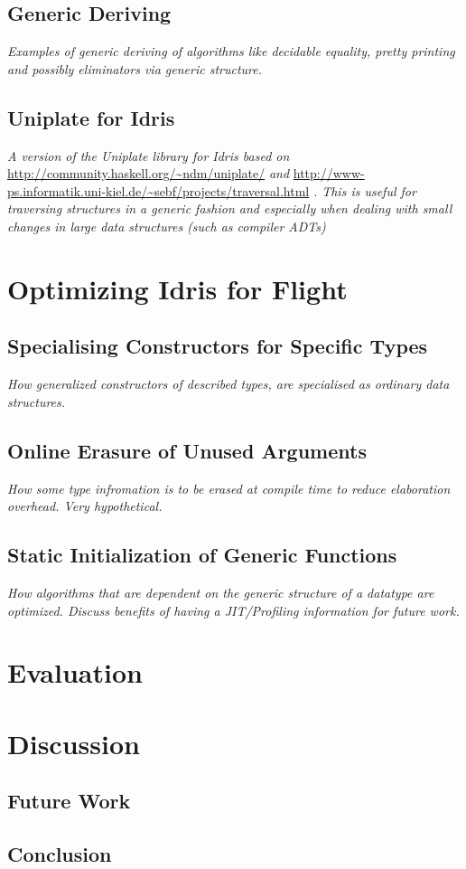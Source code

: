 \documentclass{ituthesis}
\begin{document}
\section{Generic Deriving}
\label{sec:GenericDeriving}
\textit{Examples of generic deriving of algorithms like decidable equality, pretty printing and possibly eliminators via generic structure.}

\section{Uniplate for Idris}
\label{sec:UniplateforIdris}
\textit{A version of the Uniplate library for Idris based on} \url{http://community.haskell.org/~ndm/uniplate/} \textit{and} \url{http://www-ps.informatik.uni-kiel.de/~sebf/projects/traversal.html} \textit{.
This is useful for traversing structures in a generic fashion and especially when dealing with small changes in large data structures (such as compiler ADTs)}

\chapter{Optimizing Idris for Flight}
\label{cha:OptimizingIdrisforFlight}

\section{Specialising Constructors for Specific Types}
\label{sec:SpecialisingConstructorsforSpecificTypes}
\textit{How generalized constructors of described types, are specialised as ordinary data structures.}

\section{Online Erasure of Unused Arguments}
\label{sec:OnlineErasureofUnusedArguments}
\textit{How some type infromation is to be erased at compile time to reduce elaboration overhead. Very hypothetical.}

\section{Static Initialization of Generic Functions}
\label{sec:StaticInitializationofGenericFunctions}
\textit{How algorithms that are dependent on the generic structure of a datatype are optimized. Discuss benefits of having a JIT/Profiling information for future work.}

\chapter{Evaluation}
\label{cha:Evaluation}

\chapter{Discussion}
\label{cha:Discussion}

\section{Future Work}
\label{sec:FutureWork}

\section{Conclusion}
\label{sec:Conclusion}
\end{document}
